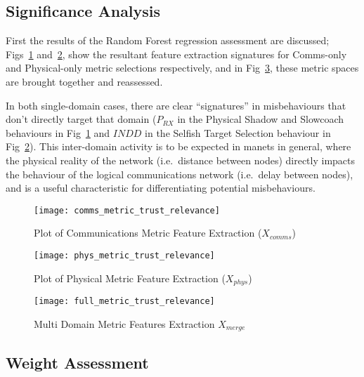 \subsection{Significance Analysis}

First the results of the Random Forest regression assessment are discussed; Figs~\ref{fig:comms_feature_extraction} and~\ref{fig:phys_feature_extraction}, show the resultant feature extraction signatures for Comms-only and Physical-only metric selections respectively, and in Fig~\ref{fig:multi_feature_extraction}, these metric spaces are brought together and reassessed.

In both single-domain cases, there are clear ``signatures'' in misbehaviours that don't directly target that domain ($P_{RX}$ in the Physical Shadow and Slowcoach behaviours in Fig~\ref{fig:comms_feature_extraction} and $INDD$ in the Selfish Target Selection behaviour in Fig~\ref{fig:phys_feature_extraction}).
This inter-domain activity is to be expected in \glspl{manet} in general, where the physical reality of the network (i.e.\ distance between nodes) directly impacts the behaviour of the logical communications network (i.e.\ delay between nodes), and is a useful characteristic for differentiating potential misbehaviours.



\begin{figure}[h!]
  \centering
  \texttt{[image: comms\_metric\_trust\_relevance]}
  \caption{Plot of Communications Metric Feature Extraction ($X_{comms}$)}
  \label{fig:comms_feature_extraction}
\end{figure}

\begin{figure}[h!]
  \centering
  \texttt{[image: phys\_metric\_trust\_relevance]}
  \caption{Plot of Physical Metric Feature Extraction ($X_{phys}$)}
  \label{fig:phys_feature_extraction}
\end{figure}

\begin{figure}[h!]
  \centering
  \texttt{[image: full\_metric\_trust\_relevance]}
  \caption{Multi Domain  Metric Features Extraction $X_{merge}$}
  \label{fig:multi_feature_extraction}
\end{figure}

%

\subsection{Weight Assessment}

